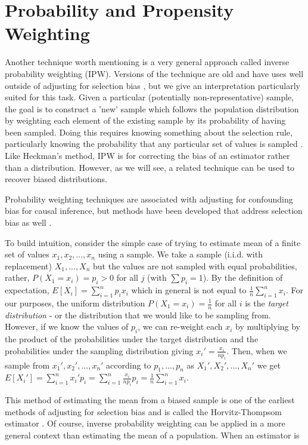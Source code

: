 \documentclass[12pt,twoside]{reedthesis}
\theoremstyle{definition}
\begin{document}
\section{Probability and Propensity Weighting}

Another technique worth mentioning is a very general approach called inverse probability weighting (IPW). Versions of the technique are old  and have uses well outside of adjusting for selection bias \citep{Horvitz_1952}, but we give an interpretation particularly suited for this task. Given a particular (potentially non-representative) sample, the goal is to construct a 'new' sample which follows the population distribution by weighting each element of the existing sample by its probability of having been sampled. Doing this requires knowing something about the selection rule, particularly knowing the probability that any particular set of values is sampled \cite{Cortes_2008}. Like Heckman's method, IPW is for correcting the bias of an estimator rather than a distribution. However, as we will see, a related technique can be used to recover biased distributions. 

Probability weighting techniques are associated with adjusting for confounding bias for causal inference, but methods have been developed that address selection bias as well \citep{Correa_2017}.

To build intuition, consider the simple case of trying to estimate mean of a finite set of values  $x_1,x_2,...,x_n$ using a sample. We take a sample (i.i.d. with replacement) $X_1,...,X_n$ but the values are not sampled with equal probabilities, rather, $P(X_1 = x_i) = p_i > 0$ for all $j$ (with $\sum p_i = 1$). By the definition of expectation, $E[X_i] = \sum_{i=1}^n p_i x_i$ which in general is not equal to $\frac{1}{n}\sum_{i=1}^n x_i$. For our purposes, the uniform distribution $P(X_1 = x_i) = \frac{1}{n}$ for all $i$ is the \emph{target distribution} - or the distribution that we would like to be sampling from. However, if we know the values of $p_i$, we can re-weight each $x_i$ by multiplying by the product of the probabilities under the target distribution and the probabilities under the sampling distribution giving $x_i' = \frac{x_i}{np_i}$. Then, when we sample from $x_1', x_2', ..., x_n'$ according to $p_1,...,p_n$ as $X_1', X_2', ..., X_n'$ we get $E[X_i'] = \sum_{i=1}^n x_i' p_i = \sum_{i=1}^n  \frac{x_i}{n p_i} p_i = \frac{1}{n} \sum_{i=1}^n x_i$. 

This method of estimating the mean from a biased sample is one of the earliest methods of adjusting for selection bias and is called the Horvitz-Thompsom estimator \citep{Little_1986}. Of course, inverse probability weighting can be applied in a more general context than estimating the mean of a population. When an estimator is
\end{document}
